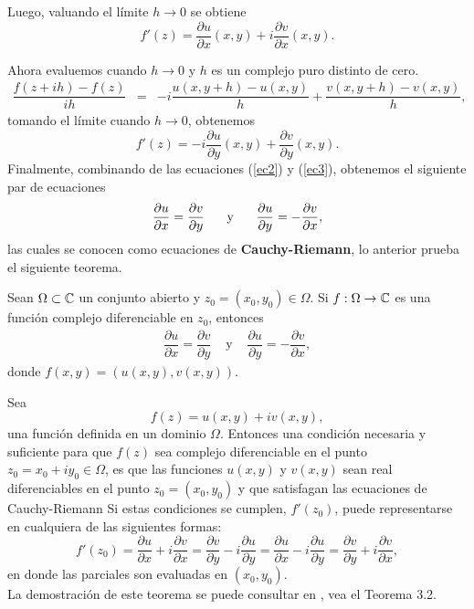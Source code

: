 Luego, valuando el límite $h\rightarrow 0$ se obtiene
\begin{equation}\label{ec2}
	f'(z)=\dfrac{\partial u}{\partial x}(x,y)+i\dfrac{\partial v}{\partial x}(x,y).
\end{equation}

Ahora evaluemos cuando $h\rightarrow 0$ y $h$ es un complejo puro distinto de cero. 
\[
\begin{array}{ccl}
	\dfrac{f(z+ih)-f(z)}{ih}&=&-i\dfrac{u(x,y+h)-u(x,y)}{h}+\dfrac{v(x,y+h)-v(x,y)}{h},
\end{array}
\]
tomando el límite cuando $h\rightarrow 0$, obtenemos  
\begin{equation}\label{ec3}
	f'(z)=-i\dfrac{\partial u}{\partial{y}}(x,y)+\dfrac{\partial v}{\partial y}(x,y).
\end{equation}
Finalmente, combinando de las ecuaciones (\ref{ec2}) y (\ref{ec3}), obtenemos el siguiente par de ecuaciones 
\begin{equation}
	\dfrac{\partial u}{\partial x} = \dfrac{\partial v}{\partial y}\hspace{0.5 cm} \mbox{ y } \hspace{0.5 cm} \dfrac{\partial u}{\partial y} =- \dfrac{\partial v}{\partial x},
\end{equation}
las cuales se conocen como ecuaciones de \textbf{Cauchy-Riemann}, lo anterior prueba el siguiente teorema.

\begin{teor}\label{teo3}
		Sean $\Omega\subset \mathbb{C}$ un conjunto abierto y $z_{0}=(x_{0},y_{0}) \in \Omega$. Si $f:\Omega\rightarrow\mathbb{C}$ es una función complejo diferenciable  en $z_{0}$, entonces
		\[
			\begin{array}{ccl}
				\dfrac{\partial u}{\partial x} = \dfrac{\partial v}{\partial y} &\mbox{ y } & \dfrac{\partial u}{\partial y} =-\dfrac{\partial v}{\partial x},
			\end{array}
		\]
		donde $f(x,y)=(u(x,y),v(x,y))$.
\end{teor}


\begin{teor}\label{TECR}
	Sea $$f(z)=u(x,y)+iv(x,y),$$ una función definida en un dominio $\Omega$. Entonces una
	condición necesaria y suficiente para que $f (z)$ sea complejo diferenciable en el punto
	$z_0 = x_0 + iy_0 \in \Omega$, es que las funciones $u(x, y)$ y $v(x, y)$ sean real diferenciables en el
	punto $z_0=(x_0, y_0)$ y que satisfagan las ecuaciones de Cauchy-Riemann
	Si estas condiciones se cumplen, $f'(z_0)$, puede representarse en cualquiera de las siguientes formas:
	\begin{equation}
		f'(z_0)=\dfrac{\partial u}{\partial x}+i\dfrac{\partial v}{\partial x}=\dfrac{\partial v}{\partial y}-i\dfrac{\partial u}{\partial y}=\dfrac{\partial u}{\partial x}-i\dfrac{\partial u}{\partial y}=\dfrac{\partial v}{\partial y}+i\dfrac{\partial v}{\partial x},
	\end{equation}
	 en donde las parciales son evaluadas en $(x_0, y_0)$.\\
	La demostración de este teorema se puede consultar en \cite{silverman}, vea el Teorema 3.2.
\end{teor}

